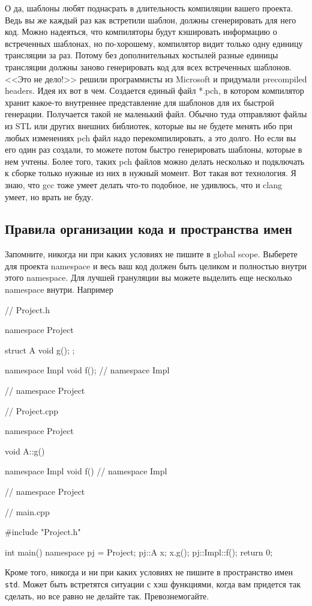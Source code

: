 \documentclass{article}
\begin{document}
О да, шаблоны любят поднасрать в длительность компиляции вашего проекта. Ведь вы же каждый раз как встретили шаблон, должны сгенерировать для него код. Можно надеяться, что компиляторы будут кэшировать информацию о встреченных шаблонах, но по-хорошему, компилятор видит только одну единицу трансляции за раз. Потому без дополнительных костылей разные единицы трансляции должны заново генерировать код для всех встреченных шаблонов. <<Это не дело!>> решили программисты из Microsoft и придумали precompiled headers. Идея их вот в чем. Создается единый файл *.pch, в котором компилятор хранит какое-то внутреннее представление для шаблонов для их быстрой генерации. Получается такой не маленький файл. Обычно туда отправляют файлы из STL или других внешних библиотек, которые вы не будете менять ибо при любых изменениях pch файл надо перекомпилировать, а это долго. Но если вы его один раз создали, то можете потом быстро генерировать шаблоны, которые в нем учтены. Более того, таких pch файлов можно делать несколько и подключать к сборке только нужные из них в нужный момент. Вот такая вот технология. Я знаю, что gcc тоже умеет делать что-то подобное, не удивлюсь, что и clang умеет, но врать не буду.

\subsection{Правила организации кода и пространства имен}

Запомните, никогда ни при каких условиях не пишите в global scope. Выберете для проекта namespace и весь ваш код должен быть целиком и полностью внутри этого namespace. Для лучшей грануляции вы можете выделить еще несколько namespace внутри. Например
\begin{cppcode}
// Project.h

namespace Project {
struct A {
  void g();
};

namespace Impl {
void f();
} // namespace Impl
} // namespace  Project

// Project.cpp

namespace Project {
void A::g() {}

namespace Impl {
void f() {}
} // namespace Impl
} // namespace Project

// main.cpp

#include "Project.h"

int main() {
  namespace pj = Project;
  pj::A x;
  x.g();
  pj::Impl::f();
  return 0;
}
\end{cppcode}
Кроме того, никогда и ни при каких условиях не пишите в пространство имен \verb"std". Может быть встретятся ситуации с хэш функциями, когда вам придется так сделать, но все равно не делайте так. Превознемогайте.
\end{document}
